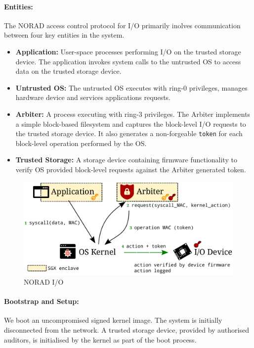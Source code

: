\documentclass[withindex,glossary]{cam-thesis}
\begin{document}
\paragraph{Entities:}
The NORAD access control protocol for I/O primarily inolves communication between four key entities in the system.
\begin{itemize}
\item \textbf{Application:} User-space processes performing I/O on the trusted storage device.
The application invokes system calls to the untrusted OS to access data on the trusted storage device.

\item \textbf{Untrusted OS:} The untrusted OS executes with ring-0 privileges, manages hardware device and services applications requests.

\item \textbf{Arbiter:} A process executing with ring-3 privileges.
The Arbiter implements a simple block-based filesystem and captures the block-level I/O requests to the trusted storage device.
It also generates a non-forgeable \texttt{token} for each block-level operation performed by the OS.

\item \textbf{Trusted Storage:} A storage device containing firmware functionality to verify OS provided block-level requests against the Arbiter generated token.

\end{itemize}


\begin{figure}[t!]
  \centering
    \includegraphics[width=1.0\columnwidth]{noradhld}
  \caption{NORAD I/O}
  \label{fig:noradhld}
\end{figure}

\paragraph{Bootstrap and Setup:}
We boot an uncompromised signed kernel image.
The system is initially disconnected from the network.
A trusted storage device, provided by authorised auditors, is initialised by the kernel as part of the boot process.
\end{document}
